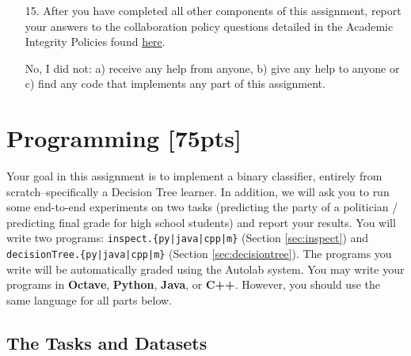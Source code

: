 \documentclass[11pt]{article}
\numberwithin{equation}{section} %
\numberwithin{figure}{section} %
\numberwithin{table}{section} %
\begin{document}
\begin{enumerate}
    
    
    \clearpage
    \item[15.] After you have completed all other components of this assignment, report your answers to the collaboration policy questions detailed in the Academic Integrity Policies found \href{http://www.cs.cmu.edu/~mgormley/courses/10601bd-f18/about.html#7-academic-integrity-policies}{here}.
    
    \begin{solution}
    No, I did not: a) receive any help from anyone, b) give any help to anyone or c) find any code that implements any part of this assignment.
 
    \end{solution}
    
\end{enumerate}

\newpage
\section{Programming [75pts]}
\label{sec:programming}

Your goal in this assignment is to implement a binary classifier, entirely from scratch--specifically a Decision Tree learner. In addition, we will ask you to run some end-to-end experiments on two tasks (predicting the party of a politician / predicting final grade for high school students) and report your results.
%
You will write two programs: \texttt{inspect.\{py|java|cpp|m\}} (Section \ref{sec:inspect}) and \texttt{decisionTree.\{py|java|cpp|m\}} (Section \ref{sec:decisiontree}). The programs you write will be automatically graded using the Autolab system. You may write your programs in \textbf{Octave}, \textbf{Python}, \textbf{Java}, or \textbf{C++}. However, you should use the same language for all parts below.

\subsection{The Tasks and Datasets}
\label{sec:data}
\end{document}
